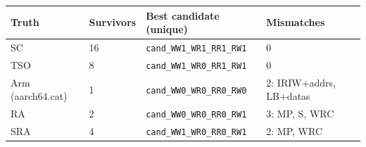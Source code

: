 \begin{tabular}{llll}
\toprule
Truth & Survivors & Best candidate (unique) & Mismatches \\
\midrule
SC & 16 & \texttt{cand\_WW1\_WR1\_RR1\_RW1} & 0 \\
TSO & 8 & \texttt{cand\_WW1\_WR0\_RR1\_RW1} & 0 \\
Arm (aarch64.cat) & 1 & \texttt{cand\_WW0\_WR0\_RR0\_RW0} & 2: IRIW+addrs, LB+datas \\
RA & 2 & \texttt{cand\_WW0\_WR0\_RR0\_RW1} & 3: MP, S, WRC \\
SRA & 4 & \texttt{cand\_WW1\_WR0\_RR0\_RW1} & 2: MP, WRC \\
\bottomrule
\end{tabular}
